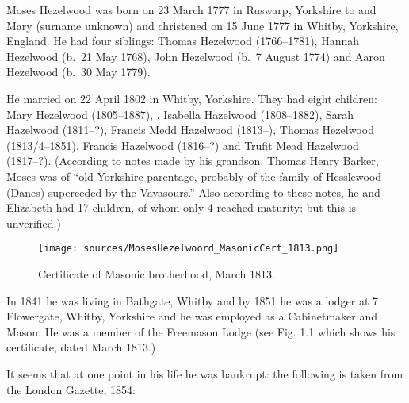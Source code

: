 
Moses Hezelwood was born on 23 March 1777 in Ruswarp, Yorkshire to  and Mary (surname unknown)
and christened on 15 June 1777 in Whitby, Yorkshire, England.\cite{MHezelwoodBirth}
He had four siblings: Thomas Hezelwood (1766--1781), Hannah Hezelwood (b.\ 21 May 1768), John Hezelwood (b.\ 7 August 1774) and Aaron Hezelwood (b.\ 30 May 1779).

He married  on 22 April 1802 in Whitby, Yorkshire.\cite{MHezelwoodMarriage}
They had eight children: Mary Hezelwood (1805--1887), , Isabella Hazelwood (1808--1882),
Sarah Hazelwood (1811--?), Francis Medd Hazelwood (1813--), Thomas Hezelwood (1813/4--1851), Francis Hazelwood (1816--?)
and Trufit Mead Hazelwood (1817--?). (According to notes made by his grandson, Thomas Henry Barker, Moses  was of
``old Yorkshire parentage, probably of the family of Hesslewood (Danes) superceded by the Vavasours.''
Also according to these notes, he and Elizabeth had 17 children, of whom only 4 reached maturity: but this is unverified.)

\begin{figure}
 \centering
 \texttt{[image: sources/MosesHezelwoord\_MasonicCert\_1813.png]}
 \caption{Certificate of Masonic brotherhood, March 1813.}
\end{figure}

In 1841 he was living in Bathgate, Whitby \cite{MHezelwood1841} and by 1851 he was a lodger at 7 Flowergate, Whitby, Yorkshire and he was employed as a Cabinetmaker and Mason.\cite{MHezelwood1851}  He was a member of the Freemason Lodge (see Fig. 1.1 which shows his certificate, dated March 1813.)

It seems that at one point in his life he was bankrupt: the following is taken from the London Gazette, 1854:\cite{MHezelwoodBankruptcy}

